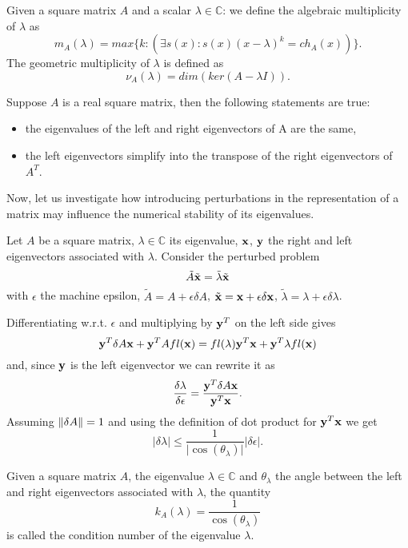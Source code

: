 \begin{definition}
    Given a square matrix \(A\) and a scalar \(\lambda \in \mathbb{C}\): we define the algebraic multiplicity of \(\lambda\) as
    \[ m_{A}(\lambda) = max\{k: (\exists s(x): s(x)(x - \lambda)^k = ch_{A}(x))\}.\]
    The geometric multiplicity of \(\lambda\) is defined as
    \[
        \nu_{A}(\lambda) = dim(ker(A - \lambda I)).
    \]
\end{definition}

\begin{remark}
    Suppose \(A\) is a real square matrix, then the following statements are true:
    \begin{itemize}[topsep=0pt, itemsep=0pt, parsep=0pt]
        \item the eigenvalues of the left and right eigenvectors of A are the same,
        \item the left eigenvectors simplify into the transpose of the right eigenvectors of \(A^T\).
    \end{itemize}
\end{remark}

Now, let us investigate how introducing perturbations in the representation of a matrix may influence the numerical stability of its
eigenvalues.

Let \(A\) be a square matrix, \(\lambda \in \mathbb{C}\) its eigenvalue, \(\vb{x}\), \(\vb{y}\) the right
and left eigenvectors associated with \(\lambda\). Consider the perturbed problem
\[
    \tilde{A} \tilde{\vb{x}} = \tilde{\lambda} \tilde{\vb{x}}
\]
with \(\epsilon\) the machine epsilon, \(\tilde{A} = A + \epsilon\delta A\), \(\tilde{\vb{x}} = \vb{x} +
\epsilon\delta \vb{x}\), \(\tilde{\lambda} = \lambda + \epsilon\delta \lambda\).

Differentiating w.r.t. \(\epsilon\) and multiplying by \(\vb{y}^T\) on the left side gives
\[
    \vb{y}^T \delta A \vb{x} + \vb{y}^T A fl(\vb{x}) = fl(\lambda) \vb{y}^T \vb{x} + \vb{y}^T \lambda fl(\vb{x})
\]
and, since \(\vb{y}\) is the left eigenvector we can rewrite it as
\[
    \dfrac{\delta \lambda}{\delta \epsilon} = \dfrac{\vb{y}^T \delta A \vb{x}}{\vb{y}^T \vb{x}}.
\]
Assuming \(\norm{\delta A} = 1\) and using the definition of dot product for \(\vb{y}^T \vb{x}\) we get
\[
    \vert \delta \lambda \vert \leq \dfrac{1}{\vert \cos(\theta_{\lambda}) \vert} \vert \delta \epsilon \vert.
\]

\begin{definition}
    Given a square matrix \(A\), the eigenvalue \(\lambda \in \mathbb{C}\) and \(\theta_{\lambda}\) the angle between the left
    and right eigenvectors associated with \(\lambda\), the quantity
    \[k_{A}(\lambda) = \dfrac{1}{\cos(\theta_{\lambda})}\]
    is called the condition number of the eigenvalue \(\lambda\).
\end{definition}
    
